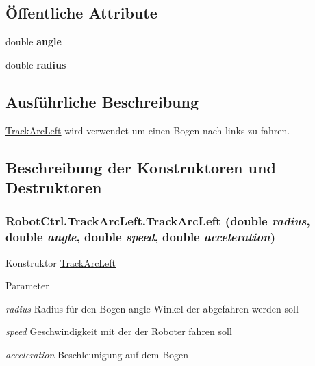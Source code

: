 \subsection*{Öffentliche Attribute}
\begin{DoxyCompactItemize}
\item 
\hypertarget{class_robot_ctrl_1_1_track_arc_left_a3d6fadeb6e8d2967178696601569b3d5}{
double {\bfseries angle}}
\label{class_robot_ctrl_1_1_track_arc_left_a3d6fadeb6e8d2967178696601569b3d5}

\item 
\hypertarget{class_robot_ctrl_1_1_track_arc_left_a74198f81576aa2160802c31d1b37c9c8}{
double {\bfseries radius}}
\label{class_robot_ctrl_1_1_track_arc_left_a74198f81576aa2160802c31d1b37c9c8}

\end{DoxyCompactItemize}


\subsection{Ausführliche Beschreibung}
\hyperlink{class_robot_ctrl_1_1_track_arc_left}{TrackArcLeft} wird verwendet um einen Bogen nach links zu fahren. 

\subsection{Beschreibung der Konstruktoren und Destruktoren}
\hypertarget{class_robot_ctrl_1_1_track_arc_left_a405f8fa89cf86603b3696a282d05dcff}{
\subsubsection[{TrackArcLeft}]{\setlength{\rightskip}{0pt plus 5cm}RobotCtrl.TrackArcLeft.TrackArcLeft (double {\em radius}, \/  double {\em angle}, \/  double {\em speed}, \/  double {\em acceleration})}}
\label{class_robot_ctrl_1_1_track_arc_left_a405f8fa89cf86603b3696a282d05dcff}
Konstruktor \hyperlink{class_robot_ctrl_1_1_track_arc_left}{TrackArcLeft}


\begin{DoxyParams}{Parameter}
\item[{\em radius}]Radius f\"{u}r den Bogen  angle Winkel der abgefahren werden soll \item[{\em speed}]Geschwindigkeit mit der der Roboter fahren soll \item[{\em acceleration}]Beschleunigung auf dem Bogen \end{DoxyParams}


